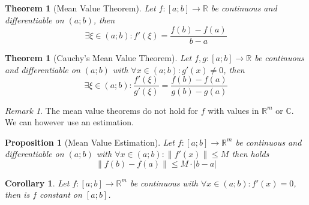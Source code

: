 \documentclass[english,titlepage]{uzhpub}
\theoremstyle{definition}
\theoremstyle{plain}
\newtheorem{proposition}[definition]{Proposition}
\newtheorem{theorem}[definition]{Theorem} %
\newtheorem{corollary}{Corollary}[theorem]
\theoremstyle{remark}
\newtheorem*{remark}{Remark}
\theoremstyle{example}
\begin{document}
   \begin{center}
      
   \end{center}

   \begin{theorem}[Mean Value Theorem]\label{thm:mean_value}
      Let \(f: [a; b] \to \mathbb{R}\) be continuous and differentiable on \((a; b)\), then
      \[\exists \xi \in (a; b): f'(\xi) = \frac{f(b) - f(a)}{b - a}\]
   \end{theorem}

   \begin{center}
      
   \end{center}

   \begin{theorem}[Cauchy's Mean Value Theorem]\label{thm:extended_mean_value}
      Let \(f, g: [a; b] \to \mathbb{R}\) be continuous and differentiable on \((a; b)\) with \(\forall x \in (a; b): g'(x) \neq 0\), then
      \[\exists \xi \in (a; b): \frac{f'(\xi)}{g'(\xi)} = \frac{f(b) - f(a)}{g(b) - g(a)}\]
   \end{theorem}

   \begin{remark}
      The mean value theorems do not hold for \(f\) with values in \(\mathbb{R}^m\) or \(\mathbb{C}\).
      We can however use an estimation.
   \end{remark}

   \begin{proposition}[Mean Value Estimation]\label{pro:mean_value_estim}
      Let \(f: [a; b] \to \mathbb{R}^m\) be continuous and differentiable on \((a; b)\) with \(\forall x \in (a; b): \|f'(x)\| \leq M\) then holds
      \[\|f(b) - f(a)\| \leq M \cdot |b - a|\]
   \end{proposition}

   \begin{corollary}\label{cor:mean_value_estim}
      Let \(f: [a; b] \to \mathbb{R}^m\) be continuous with \(\forall x \in (a; b): f'(x) = 0\), then is \(f\) constant on \([a; b]\).
   \end{corollary}
\end{document}
